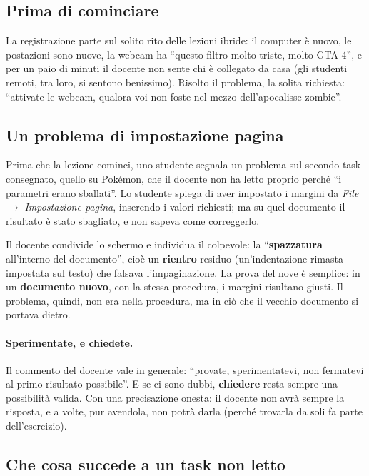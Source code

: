 \subsection{Prima di cominciare}

La registrazione parte sul solito rito delle lezioni ibride: il computer è
nuovo, le postazioni sono nuove, la webcam ha ``questo filtro molto triste,
molto GTA 4'', e per un paio di minuti il docente non sente chi è collegato da
casa (gli studenti remoti, tra loro, si sentono benissimo). Risolto il
problema, la solita richiesta: ``attivate le webcam, qualora voi non foste nel
mezzo dell'apocalisse zombie''.

\subsection{Un problema di impostazione pagina}

Prima che la lezione cominci, uno studente segnala un problema sul secondo
task consegnato, quello su Pokémon, che il docente non ha letto proprio perché
``i parametri erano sballati''. Lo studente spiega di aver impostato i margini
da \emph{File} $\rightarrow$ \emph{Impostazione pagina}, inserendo i valori
richiesti; ma su quel documento il risultato è stato sbagliato, e non sapeva
come correggerlo.

Il docente condivide lo schermo e individua il colpevole: la
``\textbf{spazzatura} all'interno del documento'', cioè un \textbf{rientro}
residuo (un'indentazione rimasta impostata sul testo) che falsava
l'impaginazione. La prova del nove è semplice: in un \textbf{documento
nuovo}, con la stessa procedura, i margini risultano giusti. Il problema,
quindi, non era nella procedura, ma in ciò che il vecchio documento si
portava dietro.

\paragraph{Sperimentate, e chiedete.} Il commento del docente vale in
generale: ``provate, sperimentatevi, non fermatevi al primo risultato
possibile''. E se ci sono dubbi, \textbf{chiedere} resta sempre una
possibilità valida. Con una precisazione onesta: il docente non avrà sempre
la risposta, e a volte, pur avendola, non potrà darla (perché trovarla da
soli fa parte dell'esercizio).

\subsection{Che cosa succede a un task non letto}

